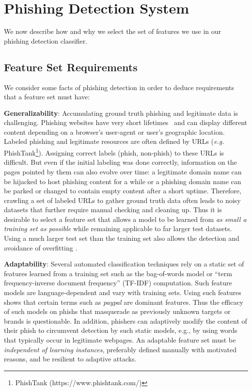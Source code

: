 \documentclass[10pt,conference,compsocconf,letterpaper]{IEEEtran}
\begin{document}
\section{Phishing Detection System}
\label{sec:classification}

\iffeateval
We now describe how and why we select the set of features we use in our phishing detection classifier.
\fi
  
\subsection{Feature Set Requirements}
\label{subsec:requirements}

We consider some facts of phishing detection in order to deduce requirements that a feature set must have:

\noindent\textbf{Generalizability}: Accumulating ground truth phishing and legitimate data is challenging. Phishing websites have very short lifetimes~\cite{apwg:2015} and can display different content depending on a browser's user-agent or user's geographic location. Labeled phishing and legitimate resources are often defined by URLs (\textit{e.g.} PhishTank\footnote{PhishTank (https://www.phishtank.com/)}). Assigning correct labels (phish, non-phish) to these URLs is difficult. But even if the initial labeling was done correctly, information on the pages pointed by them can also evolve over time: a legitimate domain name can be hijacked to host phishing content for a while or a phishing domain name can be parked or changed to contain empty content after a short uptime. Therefore, crawling a set of labeled URLs to gather ground truth data often leads to noisy datasets that further require manual checking and cleaning up.
Thus it is desirable to select a feature set that allows a model to be learned from \emph{as small a training set as possible} while remaining applicable to far larger test datasets. 
Using a much larger test set than the training set also allows the detection and avoidance of overfitting \cite{Dietterich:1995:overfitting}.  

\noindent\textbf{Adaptability}: Several automated classification techniques \cite{thomas:2011:design,whittaker:2010:large,zhang:2007:cantina} rely on a static set of features learned from a training set such as the bag-of-words model or ``term frequency-inverse document frequency'' (TF-IDF) \cite{Salton:1983:introduction} computation. Such feature models are language-dependent and vary with training sets. Using such features shows \cite{whittaker:2010:large} that certain terms such as \textit{paypal} are dominant features. Thus the efficacy of such models on phishs that masquerade as previously unknown targets or brands is questionable. 
In addition, phishers can adaptively modify the content of their phish to circumvent detection by such static models, e.g.,  by using words that typically occur in legitimate webpages.
An adaptable feature set must be \emph{independent of learning instances}, preferably defined manually with motivated reasons, and be resilient to adaptive attacks.
\end{document}
